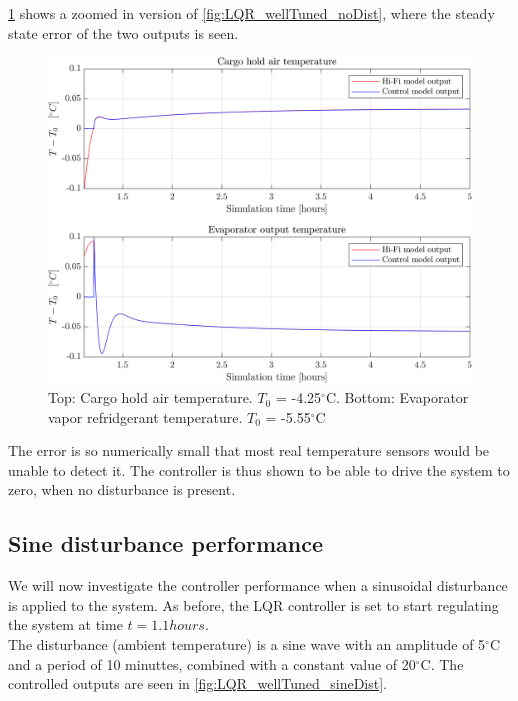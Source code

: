\cref{fig:LQR_wellTuned_noDist_zoom} shows a zoomed in version of \cref{fig:LQR_wellTuned_noDist}, where the steady state error of the two outputs is seen.\\


\begin{figure}[h!]
	\centering
	\includegraphics[width=1\textwidth]{Graphics/fig_LQR_wellTuned_noDist_zoom.png}
	\caption{Top: Cargo hold air temperature. $T_0$ = -4.25$^{\circ}$C. Bottom: Evaporator vapor refridgerant temperature. $T_0$ = -5.55$^{\circ}$C}
	\label{fig:LQR_wellTuned_noDist_zoom}
\end{figure}

The error is so numerically small that most real temperature sensors would be unable to detect it. The controller is thus shown to be able to drive the system to zero, when no disturbance is present.






\newpage
\subsection{Sine disturbance performance}
We will now investigate the controller performance when a sinusoidal disturbance is applied to the system. As before, the LQR controller is set to start regulating the system at time $t=1.1 hours$. \\


The disturbance (ambient temperature) is a sine wave with an amplitude of 5$^{\circ}$C and a period of 10 minuttes, combined with a constant value of 20$^{\circ}$C. The controlled outputs are seen in \cref{fig:LQR_wellTuned_sineDist}.\\


